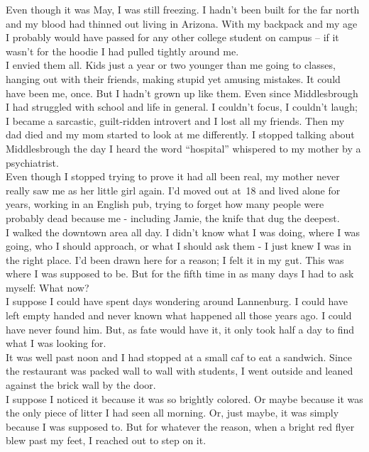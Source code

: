 \documentclass[a5paper]{scrartcl}
\begin{document}
Even though it was May, I was still freezing. I hadn't been built for the far north and my blood had thinned out living in Arizona. With my backpack and my age I probably would have passed for any other college student on campus -- if it wasn't for the hoodie I had pulled tightly around me.\\


I envied them all. Kids just a year or two younger than me going to classes, hanging out with their friends, making  stupid yet amusing mistakes. It could have been me, once. But I hadn't grown up like them. Even since Middlesbrough I had struggled with school and life in general. I couldn't focus, I couldn't laugh; I became a sarcastic, guilt-ridden introvert and I lost all my friends. Then my dad died and my mom started to look at me differently. I stopped talking about Middlesbrough the day I heard the word \enquote{hospital} whispered to my mother by a psychiatrist.\\


Even though I stopped trying to prove it had all been real, my mother never really saw me as her little girl again. I'd moved out at~18 and lived alone for years, working in an English pub, trying to forget how many people were probably dead because me - including Jamie, the knife that dug the deepest.\\


I walked the downtown area all day. I didn't know what I was doing, where I was going, who I should approach, or what I should ask them - I just knew I was in the right place. I'd been drawn here for a reason; I felt it in my gut. This was where I was supposed to be. But for the fifth time in as many days I had to ask myself: What now?\\


I suppose I could have spent days wondering around Lannenburg. I could have left empty handed and never known what happened all those years ago. I could have never found him. But, as fate would have it, it only took half a day to find what I was looking for.\\


It was well past noon and I had stopped at a small caf     to eat a sandwich. Since the restaurant was packed wall to wall with students, I went outside and leaned against the brick wall by the door.\\


I suppose I noticed it because it was so brightly colored. Or maybe because it was the only piece of litter I had seen all morning. Or, just maybe, it was simply because I was supposed to. But for whatever the reason, when a bright red flyer blew past my feet, I reached out to step on it.\\
\end{document}
